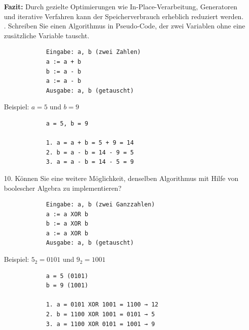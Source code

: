 \documentclass[a4paper,12pt]{article}
\begin{document}
		\textbf{Fazit:}  
		Durch gezielte Optimierungen wie In-Place-Verarbeitung, Generatoren und iterative Verfahren kann der Speicherverbrauch erheblich reduziert werden.\\
		. Schreiben Sie einen Algorithmus in Pseudo-Code, der zwei Variablen ohne eine zusätzliche Variable tauscht.
		\begin{verbatim}
			Eingabe: a, b (zwei Zahlen)
			a := a + b
			b := a - b
			a := a - b
			Ausgabe: a, b (getauscht)
		\end{verbatim}
		Beispiel: $a=5$ und $b=9$
		\begin{verbatim}
			a = 5, b = 9
			
			1. a = a + b = 5 + 9 = 14
			2. b = a - b = 14 - 9 = 5
			3. a = a - b = 14 - 5 = 9
		\end{verbatim}
		10. Können Sie eine weitere Möglichkeit, denselben Algorithmus mit Hilfe von boolescher Algebra zu implementieren?\\
		\begin{verbatim}
			Eingabe: a, b (zwei Ganzzahlen)
			a := a XOR b
			b := a XOR b
			a := a XOR b
			Ausgabe: a, b (getauscht)
		\end{verbatim}
		Beispiel: $5_2 = 0101$  und $9_2 = 1001$
		\begin{verbatim}
			a = 5 (0101)
			b = 9 (1001)
			
			1. a = 0101 XOR 1001 = 1100 → 12
			2. b = 1100 XOR 1001 = 0101 → 5
			3. a = 1100 XOR 0101 = 1001 → 9
		\end{verbatim}
\end{document}
